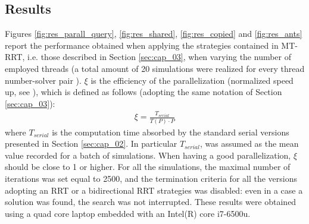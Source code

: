 \subsection{Results}

Figures \ref{fig:res_parall_query}, \ref{fig:res_shared}, \ref{fig:res_copied} and \ref{fig:res_ants} report the performance obtained when applying the strategies contained in MT-RRT, i.e. those described in Section \ref{sec:cap_03}, when varying the number of employed threads (a total amount of 20 simulations were realized for every thread number-solver pair ).
$\xi$ is the efficiency of the parallelization (normalized speed up, see \cite{efficiency_PC}), which is defined as follows (adopting the same notation of Section \ref{sec:cap_03}):
\begin{eqnarray}
\xi = \frac{T_{serial}}{T(P) \cdot P}
\end{eqnarray}
where $T_{serial}$ is the computation time absorbed by the standard serial versions presented in Section \ref{sec:cap_02}. In particular $T_{serial}$, was assumed as the mean value recorded for a batch of simulations. When having a good parallelization, $\xi$ should be close to 1 or higher. 
For all the simulations, the maximal number of iterations was set equal to 2500, and the termination criteria for all the versions adopting an RRT or a bidirectional RRT strategies was disabled: even in a case a solution was found, the search was not interrupted. 
These results were obtained using a quad core laptop embedded with an Intel(R) core i7-6500u.

